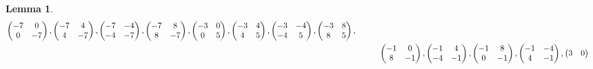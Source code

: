 \documentclass[12pt]{article}
\theoremstyle{definition}
\newtheorem{lemma}[theorem]{Lemma}
\numberwithin{equation}{section}
\numberwithin{theorem}{section}
\begin{document}
\begin{lemma}
{\begin{align}
\begin{pmatrix}
-7 & 0 \\
0 & -7
\end{pmatrix}, 
\begin{pmatrix}
-7 & 4 \\
4 & -7
\end{pmatrix}, 
\begin{pmatrix}
-7 & -4 \\
-4 & -7
\end{pmatrix}, 
\begin{pmatrix}
-7 & 8 \\
8 & -7
\end{pmatrix},  
\begin{pmatrix}
-3 & 0 \\
0 & 5
\end{pmatrix}, 
\begin{pmatrix}
-3 & 4 \\
4 & 5
\end{pmatrix}, 
\begin{pmatrix}
-3 & -4 \\
-4 & 5
\end{pmatrix}, 
\begin{pmatrix}
-3 & 8 \\
8 & 5
\end{pmatrix},    \notag  \\
&\hspace{10mm}
\begin{pmatrix}
-1 & 0 \\
8 & -1
\end{pmatrix}, 
\begin{pmatrix}
-1 & 4 \\
-4 & -1
\end{pmatrix}, 
\begin{pmatrix}
-1 & 8 \\
0 & -1
\end{pmatrix}, 
\begin{pmatrix}
-1 & -4 \\
4 & -1
\end{pmatrix},   
\begin{pmatrix}
3 & 0 \\

\end{pmatrix}
\end{align}}
\end{lemma}
\end{document}
